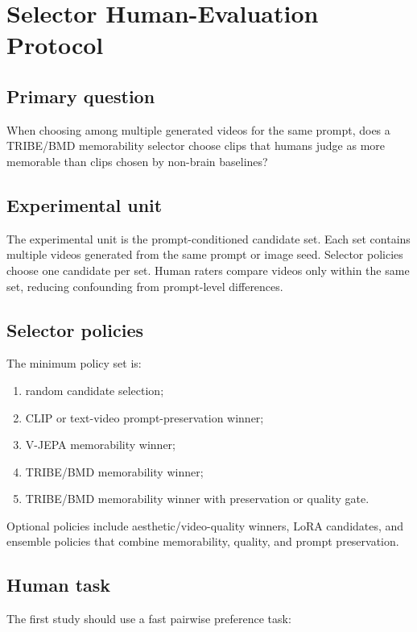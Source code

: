 \section{Selector Human-Evaluation Protocol}

\subsection{Primary question}

When choosing among multiple generated videos for the same prompt, does a
TRIBE/BMD memorability selector choose clips that humans judge as more memorable
than clips chosen by non-brain baselines?

\subsection{Experimental unit}

The experimental unit is the prompt-conditioned candidate set. Each set contains
multiple videos generated from the same prompt or image seed. Selector policies
choose one candidate per set. Human raters compare videos only within the same
set, reducing confounding from prompt-level differences.

\subsection{Selector policies}

The minimum policy set is:
\begin{enumerate}
  \item random candidate selection;
  \item CLIP or text-video prompt-preservation winner;
  \item V-JEPA memorability winner;
  \item TRIBE/BMD memorability winner;
  \item TRIBE/BMD memorability winner with preservation or quality gate.
\end{enumerate}
Optional policies include aesthetic/video-quality winners, LoRA candidates, and
ensemble policies that combine memorability, quality, and prompt preservation.

\subsection{Human task}

The first study should use a fast pairwise preference task:

